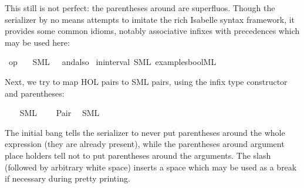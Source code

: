 \begin{isabellebody}
\begin{isamarkuptext}
  This still is not perfect: the parentheses
  around  are superfluos.  Though the serializer
  by no means attempts to imitate the rich Isabelle syntax
  framework, it provides some common idioms, notably
  associative infixes with precedences which may be used here:%
\end{isamarkuptext}%
\isamarkuptrue%
\isamarkupfalse%
\ {\isachardoublequoteopen}op\ {\isasymand}{\isachardoublequoteclose}\isanewline
\ \ {\isacharparenleft}SML\ \ {}\ {\isachardoublequoteopen}andalso{\isachardoublequoteclose}{\isacharparenright}\isanewline
\isanewline
{}\isamarkupfalse%
\ in{\isacharunderscore}interval\ {\isacharparenleft}SML\ {\isachardoublequoteopen}examples{\isacharslash}bool{}{\isachardot}ML{\isachardoublequoteclose}{\isacharparenright}%
\begin{isamarkuptext}%

  Next, we try to map HOL pairs to SML pairs, using the
  infix \qt{ * } type constructor and parentheses:%
\end{isamarkuptext}%
\isamarkuptrue%
\isanewline
{}\isamarkupfalse%
\ {\isacharasterisk}\isanewline
\ \ {\isacharparenleft}SML\ \ {}\ {\isachardoublequoteopen}{\isacharasterisk}{\isachardoublequoteclose}{\isacharparenright}\isanewline
\isanewline
{}\isamarkupfalse%
\ Pair\isanewline
\ \ {\isacharparenleft}SML\ {\isachardoublequoteopen}{\isacharbang}{\isacharparenleft}{\isacharparenleft}{\isacharunderscore}{\isacharparenright}{\isacharcomma}{\isacharslash}\ {\isacharparenleft}{\isacharunderscore}{\isacharparenright}{\isacharparenright}{\isachardoublequoteclose}{\isacharparenright}%
\begin{isamarkuptext}%
The initial bang \qt{!} tells the serializer to never put
  parentheses around the whole expression (they are already present),
  while the parentheses around argument place holders
  tell not to put parentheses around the arguments.
  The slash \qt{/} (followed by arbitrary white space)
  inserts a space which may be used as a break if necessary
  during pretty printing.


\end{isamarkuptext}
\end{isabellebody}
